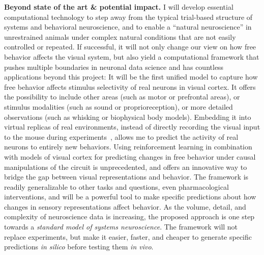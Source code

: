 \documentclass[COG,11pt]{ercgrant}
\begin{document}
\textbf{Beyond state of the art \& potential impact.} 
I will develop essential computational technology to step away from the typical trial-based structure of systems and behavioral neuroscience, and to enable a ``natural neuroscience'' in unrestrained animals under complex natural conditions that are not easily controlled or repeated. 
If successful, it will not only change our view on how free behavior affects the visual system, but also yield a computational framework that pushes multiple boundaries in neuronal data science and has countless applications beyond this project:
 It will be the first unified model to capture how free behavior affects stimulus selectivity of real neurons in visual cortex. 
It offers the possibility to include other areas (such as motor or prefrontal areas), or stimulus modalities (such as sound or proprioreception), or more detailed observations (such as whisking or biophysical body models). 
 Embedding it into virtual replicas of real environments, instead of directly recording the visual input to the mouse during experiments~\parencite{Parker2022-ac}, allows me to predict the activity of real neurons to entirely new behaviors. 
 Using reinforcement learning in combination with models of visual cortex for predicting changes in free behavior under causal manipulations of the circuit is unprecedented, and offers an innovative way to bridge the gap between visual representations and behavior. 
The framework is readily generalizable to other tasks and questions, even  pharmacological interventions, and will be a powerful tool to make specific predictions about how changes in sensory representations affect behavior.
As the volume, detail, and complexity of neuroscience data is increasing, the proposed approach is one step towards a \textit{standard model of systems neuroscience}.
The framework will not replace experiments, but make it easier, faster, and cheaper to generate specific predictions \textit{in silico} before testing them \textit{in vivo}.
\end{document}

